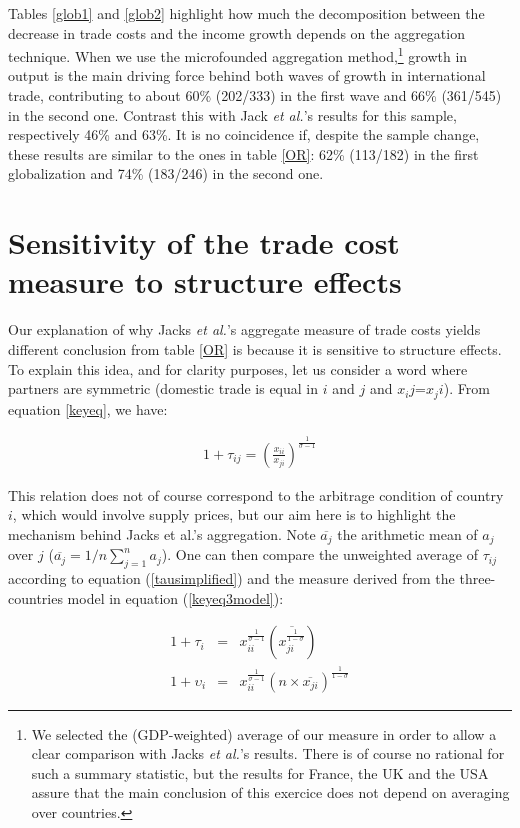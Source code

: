 \documentclass{article}
\begin{document}
Tables \ref{glob1} and \ref{glob2} highlight how much the decomposition
between the decrease in trade costs and the income growth depends on the aggregation technique. When we use the microfounded aggregation method,\footnote{We selected the (GDP-weighted) average of our measure in order
to allow a clear comparison with Jacks \textit{et al.}'s results. There
is of course no rational for such a summary statistic, but the
results for France, the UK and the USA assure that the main
conclusion of this exercice does not depend on averaging over
countries.} 
growth in output is the main driving force behind both waves of growth in international trade, contributing to about 60\% (202/333) in the first wave and 66\% (361/545) in the second one. Contrast this with Jack  \textit{et al.}'s results for this sample, respectively 46\% and 63\%.
It is no coincidence if, despite the sample change, these results are similar to the ones in table \ref{OR}: 62\% (113/182) in the first globalization and 74\% (183/246) in the second one.

\section{\label{3} Sensitivity of the trade cost measure to
structure effects}

Our explanation of why Jacks \textit{et al.}'s aggregate measure of
trade costs yields different conclusion 
from table \ref{OR} is because it is sensitive to structure
effects. To explain this idea, and for clarity purposes, let us consider
a word where partners are symmetric (domestic trade is equal in $i$ and $j$ and $x_ij$=$x_ji$). From equation \ref{keyeq}, we have:

\begin{eqnarray}
1+\tau_{ij}= \left(\frac{x_{ii}}{x_{ji}}\right)^{\frac{1}{\sigma-1}}\label{tausimplified}
\end{eqnarray}

This relation does not of course correspond to the arbitrage
condition of country $i$, which would involve supply prices,
but our aim here is to highlight the mechanism behind Jacks et
al.'s aggregation. Note $\overline{a_j}$ the arithmetic mean
of $a_j$ over $j$ ($\overline{a_j}=1/n \sum_{j=1}^{n}a_j$). One can
then compare the unweighted average of $\tau_{ij}$ according to equation 
(\ref{tausimplified}) and the measure derived from the
three-countries model in equation (\ref{keyeq3model}):

\begin{eqnarray}
1+\tau_i&=& x_{ii}^{\frac{1}{\sigma-1}} \left(\overline{{x_{ji}^{\frac{1}{1-\sigma}}}}\right) \label{tau}\\
1+\upsilon_i&=&x_{ii}^{\frac{1}{\sigma-1}} (n \times \overline{x_{ji}})^{\frac{1}{1-\sigma}}\label{upsilon}
\end{eqnarray}
\end{document}
